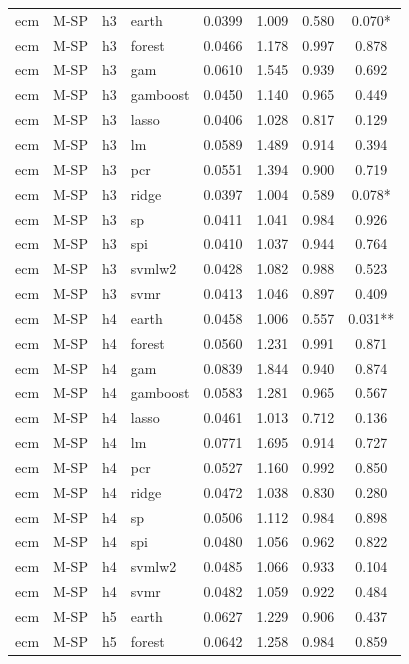 \begin{ThreePartTable}
\begin{longtable}[t]{llclcccc}
\addlinespace
ecm & M-SP & h3 & earth & 0.0399 & 1.009 & 0.580 & 0.070*\\
ecm & M-SP & h3 & forest & 0.0466 & 1.178 & 0.997 & 0.878\\
ecm & M-SP & h3 & gam & 0.0610 & 1.545 & 0.939 & 0.692\\
ecm & M-SP & h3 & gamboost & 0.0450 & 1.140 & 0.965 & 0.449\\
ecm & M-SP & h3 & lasso & 0.0406 & 1.028 & 0.817 & 0.129\\
ecm & M-SP & h3 & lm & 0.0589 & 1.489 & 0.914 & 0.394\\
ecm & M-SP & h3 & pcr & 0.0551 & 1.394 & 0.900 & 0.719\\
ecm & M-SP & h3 & ridge & 0.0397 & 1.004 & 0.589 & 0.078*\\
ecm & M-SP & h3 & sp & 0.0411 & 1.041 & 0.984 & 0.926\\
ecm & M-SP & h3 & spi & 0.0410 & 1.037 & 0.944 & 0.764\\
ecm & M-SP & h3 & svmlw2 & 0.0428 & 1.082 & 0.988 & 0.523\\
ecm & M-SP & h3 & svmr & 0.0413 & 1.046 & 0.897 & 0.409\\
\addlinespace
ecm & M-SP & h4 & earth & 0.0458 & 1.006 & 0.557 & 0.031**\\
ecm & M-SP & h4 & forest & 0.0560 & 1.231 & 0.991 & 0.871\\
ecm & M-SP & h4 & gam & 0.0839 & 1.844 & 0.940 & 0.874\\
ecm & M-SP & h4 & gamboost & 0.0583 & 1.281 & 0.965 & 0.567\\
ecm & M-SP & h4 & lasso & 0.0461 & 1.013 & 0.712 & 0.136\\
ecm & M-SP & h4 & lm & 0.0771 & 1.695 & 0.914 & 0.727\\
ecm & M-SP & h4 & pcr & 0.0527 & 1.160 & 0.992 & 0.850\\
ecm & M-SP & h4 & ridge & 0.0472 & 1.038 & 0.830 & 0.280\\
ecm & M-SP & h4 & sp & 0.0506 & 1.112 & 0.984 & 0.898\\
ecm & M-SP & h4 & spi & 0.0480 & 1.056 & 0.962 & 0.822\\
ecm & M-SP & h4 & svmlw2 & 0.0485 & 1.066 & 0.933 & 0.104\\
ecm & M-SP & h4 & svmr & 0.0482 & 1.059 & 0.922 & 0.484\\
\addlinespace
ecm & M-SP & h5 & earth & 0.0627 & 1.229 & 0.906 & 0.437\\
ecm & M-SP & h5 & forest & 0.0642 & 1.258 & 0.984 & 0.859\\

\end{longtable}
\end{ThreePartTable}
